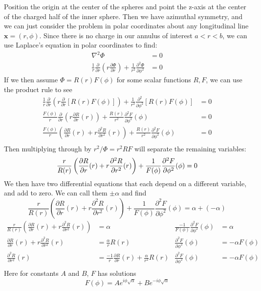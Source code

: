 \documentclass{article}
\begin{document}
\begin{solution}
Position the origin at the center of the spheres and point the z-axis at the center of the charged half of the inner sphere. Then we have azimuthal symmetry, and we can just consider the problem in polar coordinates about any longitudinal line $\mathbf{x} = (r,\phi)$. Since there is no charge in our annulus of interest $a < r < b$, we can use Laplace's equation in polar coordinates to find:
\begin{align*}
\nabla^{2} \Phi &= 0\\
\frac{1}{r} \frac{\partial}{\partial r} \left( r \frac{\partial \Phi}{\partial r} \right) + \frac{1}{r^{2}} \frac{\partial^{2} \Phi}{\partial \phi^{2}} &= 0
\end{align*}
If we then assume $\Phi=R(r)F(\phi)$ for some scalar functions $R,F$, we can use the product rule to see
\begin{align*}
\frac{1}{r} \frac{\partial}{\partial r} \left( r \frac{\partial}{\partial r} \left[ R(r)F(\phi) \right] \right) + \frac{1}{r^{2}} \frac{\partial^{2}}{\partial \phi^{2}} \left[ R(r)F(\phi) \right] &= 0\\
\frac{F(\phi)}{r} \frac{\partial}{\partial r} \left( r \frac{\partial R}{\partial r}(r) \right) + \frac{R(r)}{r^{2}} \frac{\partial^{2} F}{\partial \phi^{2}}(\phi) &= 0\\
\frac{F(\phi)}{r} \left( \frac{\partial R}{\partial r}(r) +  r \frac{\partial^{2} R}{\partial r^{2}}(r) \right) + \frac{R(r)}{r^{2}} \frac{\partial^{2} F}{\partial \phi^{2}}(\phi) &= 0\\
\end{align*}
Then multiplying through by $r^{2}/\Phi = r^{2}RF$ will separate the remaining variables:
\[ \frac{r}{R(r)} \left( \frac{\partial R}{\partial r}(r) +  r \frac{\partial^{2} R}{\partial r^{2}}(r) \right) + \frac{1}{F(\phi)} \frac{\partial^{2} F}{\partial \phi^{2}}(\phi) = 0\\ \]
We then have two differential equations that each depend on a different variable, and add to zero. We can call them $\pm\alpha$ and find
\[ \frac{r}{R(r)} \left( \frac{\partial R}{\partial r}(r) + r \frac{\partial^{2} R}{\partial r^{2}}(r) \right) + \frac{1}{F(\phi)} \frac{\partial^{2} F}{\partial \phi^{2}}(\phi) = \alpha + (-\alpha) \]
\begin{align*}
\frac{r}{R(r)} \left( \frac{\partial R}{\partial r}(r) + r \frac{\partial^{2} R}{\partial r^{2}}(r) \right) &= \alpha
&
\frac{-1}{F(\phi)} \frac{\partial^{2} F}{\partial \phi^{2}}(\phi) &= \alpha\\
\frac{\partial R}{\partial r}(r) + r \frac{\partial^{2} R}{\partial r^{2}}(r) &= \frac{\alpha}{r} R(r)
&
\frac{\partial^{2} F}{\partial \phi^{2}}(\phi) &= -\alpha F(\phi)\\
\frac{\partial^{2} R}{\partial r^{2}}(r) &= \frac{-1}{r} \frac{\partial R}{\partial r}(r) + \frac{\alpha}{r^{2}} R(r)
&
\frac{\partial^{2} F}{\partial \phi^{2}}(\phi) &= -\alpha F(\phi)\\
\end{align*}
Here for constants $A$ and $B$, $F$ has solutions
\[ F(\phi)= Ae^{i\phi\sqrt{\alpha}} + Be^{-i\phi\sqrt{\alpha}} \]


\end{solution}
\end{document}
